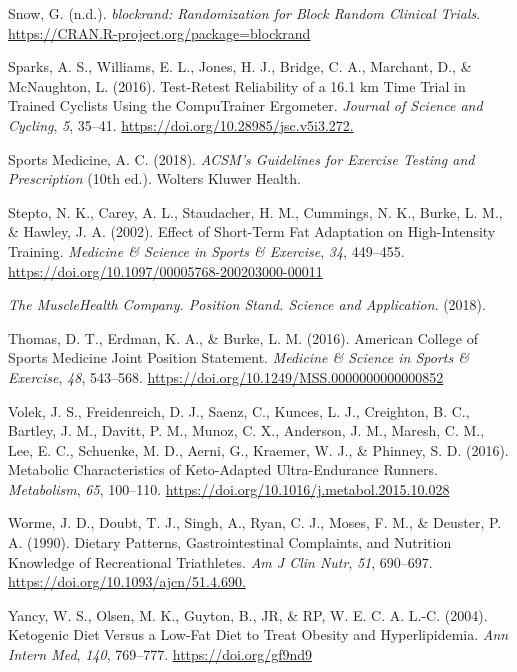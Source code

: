 \documentclass[]{cik}%
\newlength{\cslhangindent}
\newlength{\cslentryspacingunit} %
\newenvironment{CSLReferences}[2] %
 {%
  \setlength{\parindent}{0pt}
  \ifodd #1
  \let\oldpar\par
  \def\par{\hangindent=\cslhangindent\oldpar}
  \fi
  \setlength{\parskip}{#2\cslentryspacingunit}
 }%
 {}
\begin{document}
\begin{CSLReferences}{1}{0}
\leavevmode{}%
Snow, G. (n.d.). \emph{blockrand: Randomization for Block Random
Clinical Trials}. \url{https://CRAN.R-project.org/package=blockrand}

\leavevmode{}%
Sparks, A. S., Williams, E. L., Jones, H. J., Bridge, C. A., Marchant,
D., \& McNaughton, L. (2016). Test-Retest Reliability of a 16.1 km Time
Trial in Trained Cyclists Using the CompuTrainer Ergometer.
\emph{Journal of Science and Cycling}, \emph{5}, 35--41.
\url{https://doi.org/10.28985/jsc.v5i3.272.}

\leavevmode{}%
Sports Medicine, A. C. (2018). \emph{ACSM's Guidelines for Exercise
Testing and Prescription} (10th ed.). Wolters Kluwer Health.

\leavevmode{}%
Stepto, N. K., Carey, A. L., Staudacher, H. M., Cummings, N. K., Burke,
L. M., \& Hawley, J. A. (2002). Effect of Short-Term Fat Adaptation on
High-Intensity Training. \emph{Medicine \& Science in Sports \&
Exercise}, \emph{34}, 449--455.
\url{https://doi.org/10.1097/00005768-200203000-00011}

\leavevmode{}%
\emph{The MuscleHealth Company. Position Stand. Science and
Application}. (2018).

\leavevmode{}%
Thomas, D. T., Erdman, K. A., \& Burke, L. M. (2016). American College
of Sports Medicine Joint Position Statement. \emph{Medicine \& Science
in Sports \& Exercise}, \emph{48}, 543--568.
\url{https://doi.org/10.1249/MSS.0000000000000852}

\leavevmode{}%
Volek, J. S., Freidenreich, D. J., Saenz, C., Kunces, L. J., Creighton,
B. C., Bartley, J. M., Davitt, P. M., Munoz, C. X., Anderson, J. M.,
Maresh, C. M., Lee, E. C., Schuenke, M. D., Aerni, G., Kraemer, W. J.,
\& Phinney, S. D. (2016). Metabolic Characteristics of Keto-Adapted
Ultra-Endurance Runners. \emph{Metabolism}, \emph{65}, 100--110.
\url{https://doi.org/10.1016/j.metabol.2015.10.028}

\leavevmode{}%
Worme, J. D., Doubt, T. J., Singh, A., Ryan, C. J., Moses, F. M., \&
Deuster, P. A. (1990). Dietary Patterns, Gastrointestinal Complaints,
and Nutrition Knowledge of Recreational Triathletes. \emph{Am J Clin
Nutr}, \emph{51}, 690--697. \url{https://doi.org/10.1093/ajcn/51.4.690.}

\leavevmode{}%
Yancy, W. S., Olsen, M. K., Guyton, B., JR, \& RP, W. E. C. A. L.-C.
(2004). Ketogenic Diet Versus a Low-Fat Diet to Treat Obesity and
Hyperlipidemia. \emph{Ann Intern Med}, \emph{140}, 769--777.
\url{https://doi.org/gf9nd9}


\end{CSLReferences}
\end{document}
